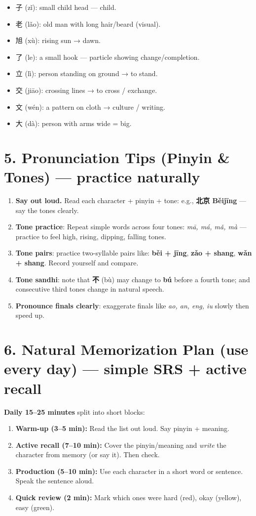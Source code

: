 \documentclass[12pt]{article}
\begin{document}
\begin{CJK}{UTF8}{gbsn}
\begin{itemize}[leftmargin=*]
  \item 子 (zǐ): small child head — child.
  \item 老 (lǎo): old man with long hair/beard (visual).
  \item 旭 (xù): rising sun → dawn.
  \item 了 (le): a small hook — particle showing change/completion.
  \item 立 (lì): person standing on ground → to stand.
  \item 交 (jiāo): crossing lines → to cross / exchange.
  \item 文 (wén): a pattern on cloth → culture / writing.
  \item 大 (dà): person with arms wide = big.
\end{itemize}

\section*{5. Pronunciation Tips (Pinyin \& Tones) — practice naturally}
\begin{enumerate}
  \item \textbf{Say out loud.} Read each character + pinyin + tone: e.g., \textbf{北京 Běijīng} — say the tones clearly.
  \item \textbf{Tone practice}: Repeat simple words across four tones: \textit{mā, má, mǎ, mà} — practice to feel high, rising, dipping, falling tones.
  \item \textbf{Tone pairs}: practice two-syllable pairs like: \textbf{běi + jīng}, \textbf{zǎo + shang}, \textbf{wǎn + shang}. Record yourself and compare.
  \item \textbf{Tone sandhi}: note that \textbf{不} (bù) may change to \textbf{bú} before a fourth tone; and consecutive third tones change in natural speech.
  \item \textbf{Pronounce finals clearly}: exaggerate finals like \textit{ao, an, eng, iu} slowly then speed up.
\end{enumerate}

\section*{6. Natural Memorization Plan (use every day) — simple SRS + active recall}
\textbf{Daily 15--25 minutes} split into short blocks:
\begin{enumerate}
  \item \textbf{Warm-up (3--5 min):} Read the list out loud. Say pinyin + meaning.
  \item \textbf{Active recall (7--10 min):} Cover the pinyin/meaning and \emph{write} the character from memory (or say it). Then check.
  \item \textbf{Production (5--10 min):} Use each character in a short word or sentence. Speak the sentence aloud.
  \item \textbf{Quick review (2 min):} Mark which ones were hard (red), okay (yellow), easy (green).
\end{enumerate}


\end{CJK}
\end{document}
